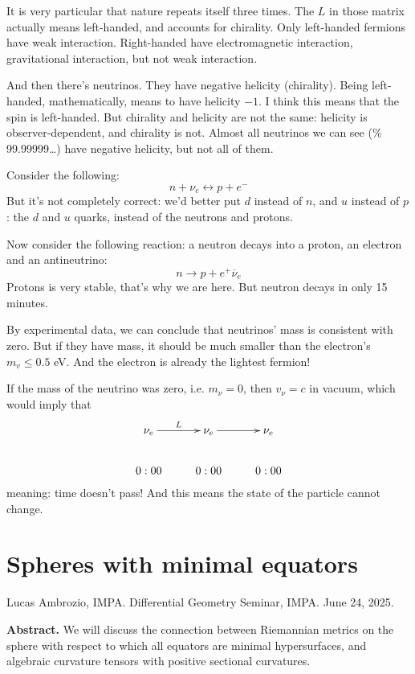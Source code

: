 \medskip

It is very particular that nature repeats itself three times. The $L$ in those
matrix actually means left-handed, and accounts for chirality. Only left-handed
fermions have weak interaction. Right-handed have electromagnetic interaction,
gravitational interaction, but not weak interaction.

And then there's neutrinos. They have negative helicity (chirality). Being
left-handed, mathematically, means to have helicity $-1$. I think this means
that the spin is left-handed. But chirality and helicity are not the same:
helicity is observer-dependent, and chirality is not. Almost all neutrinos we
can see (\% 99.99999…) have negative helicity, but not all of them.

Consider the following:
$$
n+\nu_e\leftrightarrow p+e^-
$$
But it's not completely correct: we'd better put $d$ instead of $n$, and $u$
instead of $p$: the $d$ and $u$ quarks, instead of the neutrons and protons.

Now consider the following reaction: a neutron decays into a proton, an electron
and an antineutrino:
$$
n\to p+e^+\overline{\nu}_e
$$
Protons is very stable, that's why we are here. But neutron decays in only 15
minutes.

By experimental data, we can conclude that neutrinos' mass is consistent with
zero. But if they have mass, it should be much smaller than the electron's $m_v
\leq 0.5$ eV. And the electron is already the lightest fermion!

If the mass of the neutrino was zero, i.e. $m_\nu=0$, then $v_\nu=c$ in vacuum,
which would imply that 
$$
\xymatrix{
\nu_e\ar[r]^{L}&\nu_e\ar[r]&\nu_e\\
0:00&0:00&0:00
}
$$
meaning: time doesn't pass! And this means the state of the particle cannot
change.

\section{Spheres with minimal equators}
\label{section-spheres-with-minimal-equators}

\noindent
Lucas Ambrozio, IMPA.
Differential Geometry Seminar, IMPA. 
June 24, 2025.

\medskip
{\bf Abstract.} We will discuss the connection between Riemannian metrics on the
sphere with respect to which all equators are minimal hypersurfaces, and
algebraic curvature tensors with positive sectional curvatures.

\bigskip\noindent

